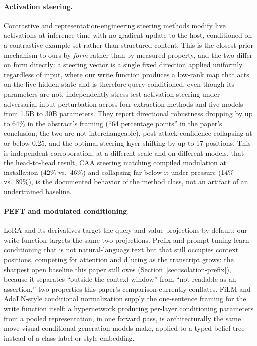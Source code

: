 \paragraph{Activation steering.} Contrastive and representation-engineering steering
methods \citep{turner2023activation,zou2023representation,rimsky2024caa} modify live
activations at inference time with no gradient update to the host, conditioned on a
contrastive example set rather than structured content. This is the closest prior
mechanism to ours by \emph{form} rather than by measured property, and the two
differ on form directly: a steering vector is a single fixed direction applied
uniformly regardless of input, where our write function produces a low-rank map that
acts on the live hidden state and is therefore query-conditioned, even though its
parameters are not. \citet{le2026steeringrobustness} independently stress-test
activation steering under adversarial input perturbation across four extraction methods
and five models from 1.5B to 30B parameters. They report directional robustness dropping
by up to 64\% in the abstract's framing (``64 percentage points'' in the paper's
conclusion; the two are not interchangeable), post-attack confidence collapsing at
or below 0.25, and the optimal steering layer shifting by up to 17 positions. This is
independent corroboration, at a different scale and on different models, that the
head-to-head result, CAA steering matching compiled modulation at installation (42\%
vs.\ 46\%) and collapsing far below it under pressure (14\% vs.\ 89\%), is the
documented behavior of the method class, not an artifact of an undertrained baseline.

\paragraph{PEFT and modulated conditioning.} LoRA \citep{hu2021lora} and its
derivatives target the query and value projections by default; our write function
targets the same two projections.
Prefix and prompt tuning \citep{li2021prefix,lester2021power} learn conditioning that is
not natural-language text but that still occupies context positions, competing for
attention and diluting as the transcript grows: the sharpest open baseline this paper
still owes (Section~\ref{sec:isolation-prefix}), because it separates ``outside the
context window'' from ``not readable as an assertion,'' two properties this paper's
comparison currently conflates. FiLM \citep{perez1970film} and AdaLN-style conditional
normalization \citep{xu2019adain} supply the one-sentence framing for the write function
itself: a hypernetwork producing per-layer conditioning parameters from a pooled
representation, in one forward pass, is architecturally the same move visual
conditional-generation models make, applied to a typed belief tree instead of a class
label or style embedding.


